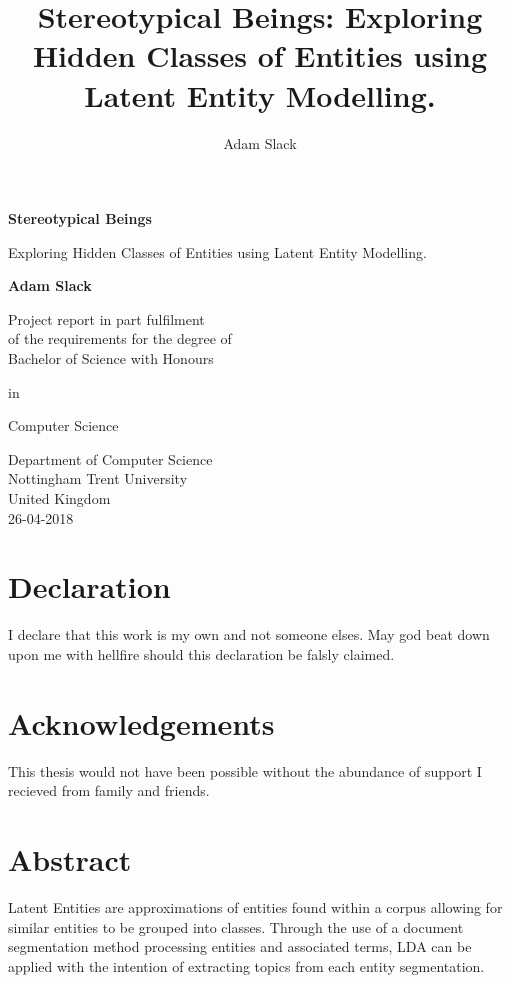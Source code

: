 \documentclass[10pt]{report}
\title{Stereotypical Beings: Exploring Hidden Classes of Entities using Latent Entity Modelling.}
\author{Adam Slack}
\date{}
\begin{document}
 
\begin{titlepage}
    \begin{center}
        \vspace*{1cm}
        
        \Huge\textbf{Stereotypical Beings}
        
        \huge\vspace{0.5cm}
                Exploring Hidden Classes of Entities using Latent Entity Modelling.
                \vspace{1.5cm}
               
        \large\textbf{Adam Slack}

        \vfill
        
        \normalsize Project report in part fulfilment
        \\of the requirements for the degree of
        \\Bachelor of Science with Honours

        in

        Computer Science
        \vspace{0.8cm}
        
        
        Department of Computer Science\\
        Nottingham Trent University\\
        United Kingdom\\
        26-04-2018
        
    \end{center}
\end{titlepage}

\section*{Declaration}

I declare that this work is my own and not someone elses. May god beat down upon me with hellfire should this declaration be falsly claimed.

\newpage
\section*{Acknowledgements}
This thesis would not have been possible without the abundance of support I recieved from family and friends. 

\newpage
{}
\section*{Abstract}
Latent Entities are approximations of entities found within a corpus allowing for similar entities to be grouped into classes. Through the use of a document segmentation method processing entities and associated terms, LDA can be applied with the intention of extracting topics from each entity segmentation.
\end{document}
